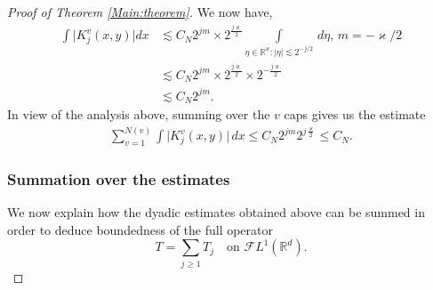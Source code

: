 \documentclass[12pt, reqno]{amsart}
\theoremstyle{definition}
\theoremstyle{remark}
\numberwithin{equation}{section}
\begin{document}
\begin{proof}[Proof of Theorem \ref{Main:theorem}]
We now have,
\begin{align*}
    \int\big|K_j^v(x,y)\big|dx &\lesssim   C_N 2^{jm} \times 2^{\frac{j\varkappa}{2}} \int\limits_{\eta\in \mathbb{R}^\varkappa:|\eta|\lesssim 2^{-j/2}} \,d\eta,\,m=-\varkappa/2\\&
    \lesssim  C_N 2^{jm} \times 2^{\frac{j\varkappa}{2}} \times 2^{-\frac{j\varkappa}{2}}\\&
    \lesssim C_N 2^{jm}.    
\end{align*}
In view of the analysis above,
summing over the $v$ caps gives us the estimate
\begin{align*}
\sum\limits_{v=1}^{N(v)}\displaystyle{\int}\big|K_{j}^v(x,y)\big|\,dx\le C_N 2^{jm}2^{j\frac{\varkappa}{2}}\le C_N.
\end{align*}


\subsubsection*{Summation over the estimates}

We now explain how the dyadic estimates obtained above can be summed in order
to deduce boundedness of the full operator
\[
T = \sum_{j\ge1} T_j
\quad \text{on } \mathcal{F}L^1(\mathbb{R}^d).
\]


\end{proof}
\end{document}
